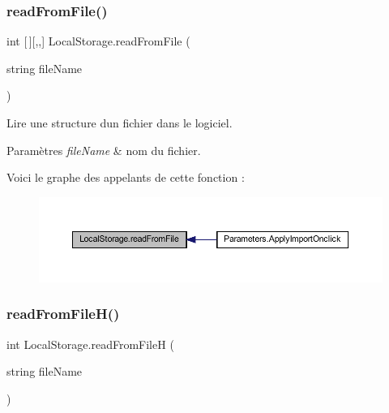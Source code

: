 \subsubsection{\texorpdfstring{read\+From\+File()}{readFromFile()}}
{\footnotesize\ttfamily int \mbox{[}$\,$\mbox{]}\mbox{[},,\mbox{]} Local\+Storage.\+read\+From\+File (\begin{DoxyParamCaption}\item[{string}]{file\+Name }\end{DoxyParamCaption})\hspace{0.3cm}{\ttfamily [inline]}}



Lire une structure d\textquotesingle{}un fichier dans le logiciel. 


\begin{DoxyParams}{Paramètres}
{\em file\+Name} & nom du fichier.\\
\hline
\end{DoxyParams}
Voici le graphe des appelants de cette fonction \+:
\nopagebreak
\begin{figure}[H]
\begin{center}
\leavevmode
\includegraphics[width=350pt]{class_local_storage_a200c8f22ceed88238703411e2c0f1e05_icgraph}
\end{center}
\end{figure}
\mbox{\label{class_local_storage_ab0e31baa14b85dc8a8bd21aa1d53ab09}} 
\subsubsection{\texorpdfstring{read\+From\+File\+H()}{readFromFileH()}}
{\footnotesize\ttfamily int Local\+Storage.\+read\+From\+FileH (\begin{DoxyParamCaption}\item[{string}]{file\+Name }\end{DoxyParamCaption})\hspace{0.3cm}{\ttfamily [inline]}}



